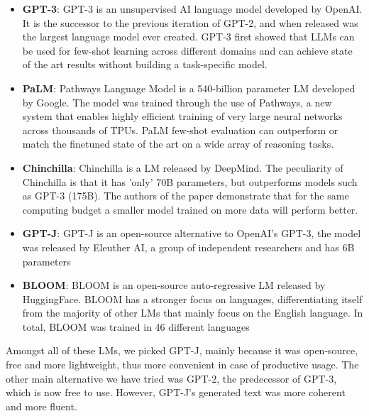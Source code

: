 \begin{itemize}
    \item \textbf{GPT-3}: GPT-3\cite{brown2020language} is an unsupervised AI language model developed by OpenAI. It is the successor to the previous iteration of GPT-2, and when released was the largest language model ever created. GPT-3 first showed that LLMs can be used for few-shot learning across different domains and can achieve state of the art results without building a task-specific model.
    \item \textbf{PaLM}: Pathways Language Model\cite{chowdhery2022palm} is a 540-billion parameter LM developed by Google. The model was trained through the use of Pathways, a new system that enables highly efficient training of very large neural networks across thousands of TPUs. PaLM few-shot evaluation can outperform or match the finetuned state of the art on a wide array of reasoning tasks.
    \item \textbf{Chinchilla}: Chinchilla\cite{hoffmann2022training} is a LM released by DeepMind. The peculiarity of Chinchilla is that it has 'only' 70B parameters, but outperforms models such as GPT-3 (175B). The authors of the paper demonstrate that for the same computing budget a smaller model trained on more data will perform better.
    \item \textbf{GPT-J}: GPT-J\cite{gptj} is an open-source alternative to OpenAI's GPT-3, the model was released by Eleuther AI, a group of independent researchers and has 6B parameters
    \item \textbf{BLOOM}: BLOOM\cite{scao2022bloom} is an open-source auto-regressive LM released by HuggingFace. BLOOM has a stronger focus on languages, differentiating itself from the majority of other LMs that mainly focus on the English language. In total, BLOOM was trained in 46 different languages
\end{itemize}
Amongst all of these LMs, we picked GPT-J, mainly because it was open-source, free and more lightweight, thus more convenient in case of productive usage. The other main alternative we have tried was GPT-2\cite{radford2019language}, the predecessor of GPT-3, which is now free to use. However, GPT-J's generated text was more coherent and more fluent.\\



